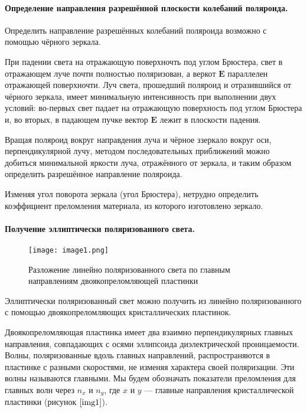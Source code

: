 \documentclass[a4paper,12pt]{article} %
\begin{document}
\paragraph{Определение направления разрешённой плоскости колебаний поляроида.} Определить направление разрешённых колебаний поляроида возможно с помощью чёрного зеркала.

При падении света на отражающую поверхночть под углом Брюстера, свет в отражающем луче почти полностью поляризован, а веркот $\mathbf{E}$ параллелен отражающей поверхночти. Луч света, прошедший поляроид и отразившийся от чёрного зеркала, имеет минимальную интенсивность при выполнении двух условий: во-первых свет падает на отражающую поверхность под углом Брюстера и, во вторых, в падающем пучке вектор $\textbf{E}$ лежит в плоскости падения.

Вращая поляроид вокруг направдения луча и чёрное ззеркало вокруг оси, перпендикулярной лучу, методом последовательных приближений можно добиться минимальной яркости луча, отражённого от зеркала, и таким образом определить разрешённое направление поляроида.

Изменяя угол поворота зеркала (угол Брюстера), нетрудно определить коэффициент преломления материала, из которого изготовлено зеркало. 

\paragraph{Получение эллиптически поляризованного света.}

\begin{wrapfigure}{r}{0.35\linewidth} 
    \texttt{[image: image1.png]}
    \caption{Разложение линейно поляризованного света по главным направлениям двоякопреломляющей пластинки}
    \label{img1}
\end{wrapfigure}

Эллиптически поляризованный свет можно получить из линейно поляризованного с
помощью двоякопреломляющих кристаллических пластинок.

Двоякопреломляющая пластинка имеет два взаимно перпендикулярных главных направления, совпадающих с осями эллипсоида диэлектрической проницаемости. Волны, поляризованные вдоль главных направлений, распространяются в пластинке с разными скоростями, не изменяя характера своей поляризации. Эти волны называются главными. Мы будем обозначать показатели преломления для главных волн через $n_x$ и $n_y$, где $x$ и $y$ --- главные направления кристаллической пластинки (рисунок $\ref{img1}$).
\end{document}
